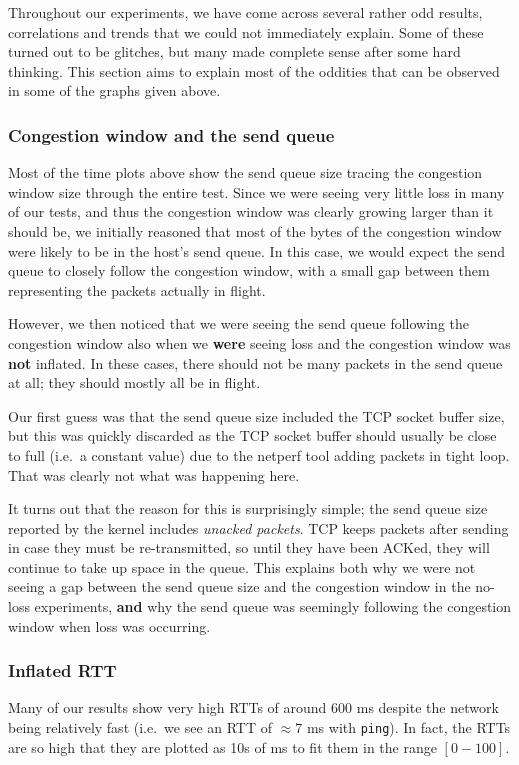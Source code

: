 Throughout our experiments, we have come across several rather odd results,
correlations and trends that we could not immediately explain. Some of these
turned out to be glitches, but many made complete sense after some hard
thinking. This section aims to explain most of the oddities that can be observed
in some of the graphs given above.

\subsubsection{Congestion window and the send queue}
Most of the time plots above show the send queue size tracing the congestion
window size through the entire test. Since we were seeing very  little loss in many
of our tests, and thus the congestion window was clearly growing larger than it
should be, we initially reasoned that most of the bytes of the congestion window were likely to be in the host's send queue. In this case, we would expect the send queue to closely follow the congestion window, with a small gap between them representing the packets actually in flight.

However, we then noticed that we were seeing the send queue following
the congestion window also when we \textbf{were} seeing loss and the congestion
window was \textbf{not} inflated. In these cases, there should not be many
packets in the send queue at all; they should mostly all be in flight.

Our first guess was that the send queue size included the TCP socket buffer
size, but this was quickly discarded as the TCP socket buffer should usually be close to
full (i.e.\ a constant value) due to the netperf tool adding packets
in tight loop. That was clearly not what was happening here.

It turns out that the reason for this is surprisingly simple; the send queue
size reported by the kernel includes \textit{unacked packets}. TCP keeps packets after sending in case they must be re-transmitted, so until they have been ACKed, they
will continue to take up space in the queue. This explains both why we were not
seeing a gap between the send queue size and the congestion window in the
no-loss experiments, \textbf{and} why the send queue was seemingly following the
congestion window when loss was occurring.

\subsubsection{Inflated RTT}
Many of our results show very high RTTs of around 600 ms despite the network being relatively
fast (i.e.\ we see an RTT of $\approx 7$ ms with \texttt{ping}). In fact, the
RTTs are so high that they are plotted as 10s of ms to fit them in
the range $[0-100]$.

